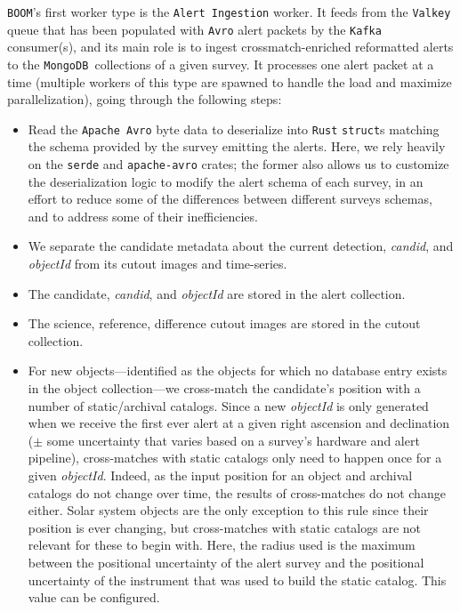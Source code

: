 \documentclass[twocolumn]{aastex631}
\newcommand{\kafka}{\texttt{Kafka }}
\newcommand{\valkey}{\texttt{Valkey }}
\newcommand{\mongo}{\texttt{MongoDB }}
\begin{document}
\texttt{BOOM}'s first worker type is the \texttt{Alert Ingestion} worker. It feeds from the \valkey queue that has been populated with \texttt{Avro} alert packets by the \kafka consumer(s), and its main role is to ingest crossmatch-enriched reformatted alerts to the \mongo collections of a given survey. It processes one alert packet at a time (multiple workers of this type are spawned to handle the load and maximize parallelization), going through the following steps:
\begin{itemize}
\item Read the \texttt{Apache Avro} byte data to deserialize into \texttt{Rust} \texttt{struct}s matching the schema provided by the survey emitting the alerts. Here, we rely heavily on the \texttt{serde} and \texttt{apache-avro} crates; the former also allows us to customize the deserialization logic to modify the alert schema of each survey, in an effort to reduce some of the differences between different surveys schemas, and to address some of their inefficiencies.
\item We separate the candidate metadata about the current detection, \textit{candid}, and \textit{objectId} from its cutout images and time-series.
\item The candidate, \textit{candid}, and \textit{objectId} are stored in the alert collection.
\item The science, reference, difference cutout images are stored in the cutout collection.
\item For new objects---identified as the objects for which no database entry exists in the object collection---we cross-match the candidate's position with a number of static/archival catalogs. Since a new \textit{objectId} is only generated when we receive the first ever alert at a given right ascension and declination ($\pm$ some uncertainty that varies based on a survey's hardware and alert pipeline), cross-matches with static catalogs only need to happen once for a given \textit{objectId}. Indeed, as the input position for an object and archival catalogs do not change over time, the results of cross-matches do not change either. Solar system objects are the only exception to this rule since their position is ever changing, but cross-matches with static catalogs are not relevant for these to begin with. Here, the radius used is the maximum between the positional uncertainty of the alert survey and the positional uncertainty of the instrument that was used to build the static catalog. This value can be configured.

\end{itemize}
\end{document}
